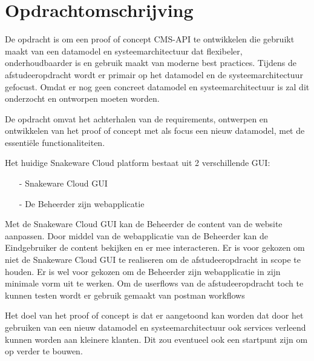 \section{Opdrachtomschrijving}
\label{sec:Opdrachtomschrijving}
De opdracht is om een proof of concept CMS-API te ontwikkelen die gebruikt maakt van een datamodel en systeemarchitectuur dat flexibeler, onderhoudbaarder is en gebruik maakt van moderne best practices.
Tijdens de afstudeeropdracht wordt er primair op het datamodel en de systeemarchitectuur gefocust.
Omdat er nog geen concreet datamodel en systeemarchitectuur is zal dit onderzocht en ontworpen moeten worden.

\whitespace[2]
De opdracht omvat het achterhalen van de requirements, ontwerpen en ontwikkelen van het proof of concept met als focus een nieuw datamodel, met de essentiële functionaliteiten.

\whitespace[2]
Het huidige Snakeware Cloud platform bestaat uit 2 verschillende \gls{GUI}:
\begin{itemize}
	\item[-] Snakeware Cloud \gls{GUI}
    \item[-] De \gls{Beheerder} zijn webapplicatie
\end{itemize}

\whitespace
Met de Snakeware Cloud \gls{GUI} kan de \gls{Beheerder} de content van de website aanpassen.
Door middel van de webapplicatie van de \gls{Beheerder} kan de \gls{Eindgebruiker} de content bekijken en er mee interacteren.
Er is voor gekozen om niet de Snakeware Cloud \gls{GUI} te realiseren om de afstudeeropdracht in scope te houden.
Er is wel voor gekozen om de \gls{Beheerder} zijn webapplicatie in zijn minimale vorm uit te werken.
Om de userflows van de afstudeeropdracht toch te kunnen testen wordt er gebruik gemaakt van postman workflows \Parencite{PostmanWorkflows}

\whitespace[2]
Het doel van het proof of concept is dat er aangetoond kan worden dat door het gebruiken van een nieuw datamodel en systeemarchitectuur ook services verleend kunnen worden aan kleinere klanten.
Dit zou eventueel ook een startpunt zijn om op verder te bouwen.
%
